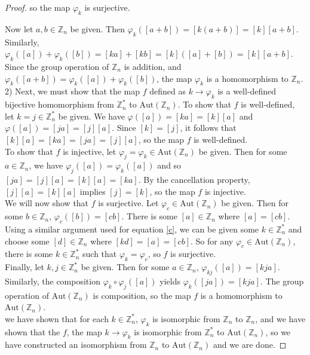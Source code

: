 \documentclass{article}
\begin{document}
\begin{proof}
        
    so the map $\varphi_k$ is surjective.

    Now let $a, b \in \mathbb{Z}_n$ be given.  Then $\varphi_k([a + b]) = [k(a+b)] = [k][a+b]$.  Similarly, 
    $\varphi_k([a]) + \varphi_k([b]) = [ka] + [kb] = [k]([a] + [b]) = [k][a+b]$.  Since the group operation of $\mathbb{Z}_n$ 
    is addition, and $\varphi_k([a+b]) = \varphi_k([a]) + \varphi_k([b])$, the map $\varphi_k$ is a homomorphism to $\mathbb{Z}_n$.\\ 

    2) Next, we must show that the map $f$ defined as $k \rightarrow \varphi_k$ is a well-defined bijective homomorphism from 
    $\mathbb{Z}_n^*$ to $\mathrm{Aut}(\mathbb{Z}_n)$.  To show that $f$ is well-defined, let $k = j \in \mathbb{Z}_n^*$ 
    be given.  We have $\varphi([a]) = [ka] = [k][a]$ and $\varphi([a]) = [ja] = [j][a]$.  Since $[k] = [j]$, 
    it follows that $[k][a] = [ka] = [ja] = [j][a]$, so the map $f$ is well-defined. \\ 

    To show that $f$ is injective, let $\varphi_j = \varphi_k \in \mathrm{Aut}(\mathbb{Z}_n)$ be given.  Then for some $a \in \mathbb{Z}_n$, 
    we have $\varphi_j([a]) = \varphi_k([a])$ and so $[ja] = [j][a] = [k][a] = [ka]$.  By the cancellation property, 
    $[j][a] = [k][a]$ implies $[j] = [k]$, so the map $f$ is injective. \\ 

    We will now show that $f$ is surjective.  Let $\varphi_c \in \mathrm{Aut}(\mathbb{Z}_n)$ be 
    given.  Then for some $b \in \mathbb{Z}_n$, $\varphi_c([b]) = [cb]$.  There is some 
    $[a] \in \mathbb{Z}_n$ where $[a] = [cb]$.  Using a similar argument used for 
    equation \eqref{c}, we can be given some $k \in \mathbb{Z}_n^*$ and choose some $[d] \in \mathbb{Z}_n$ 
    where $[kd] = [a] = [cb]$. So for any $\varphi_c \in \mathrm{Aut}(\mathbb{Z}_n)$, there is some $k \in \mathbb{Z}_n^*$ 
    such that $\varphi_k = \varphi_c$, so $f$ is surjective. \\ 

    Finally, let $k, j \in \mathbb{Z}_n^*$ be given.  Then for some $a \in \mathbb{Z}_n$, 
    $\varphi_{kj}([a]) = [kja]$.  Similarly, the composition $\varphi_k \circ \varphi_j ([a])$ 
    yields $\varphi_k([ja]) = [kja]$.  The group operation of $\mathrm{Aut}(\mathbb{Z}_n)$ is composition, 
    so the map $f$ is a homomorphism to $\mathrm{Aut}(\mathbb{Z}_n)$. \\ 

    we have shown that for each $k \in \mathbb{Z}_n^*$, $\varphi_k$ is isomorphic from $\mathbb{Z}_n$ to 
    $\mathbb{Z}_n$, and we have shown that the $f$, the map $k \rightarrow \varphi_k$ is isomorphic 
    from $\mathbb{Z}_n^*$ to $\mathrm{Aut}(\mathbb{Z}_n)$, so we have constructed an isomorphism from 
    $\mathbb{Z}_n$ to $\mathrm{Aut}(\mathbb{Z}_n)$ and we are done.
\end{proof}
\end{document}
